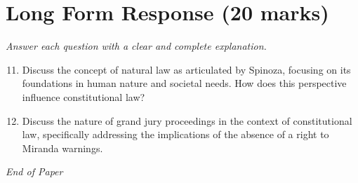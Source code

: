 \documentclass[12pt]{article}
\begin{document}
\section*{Long Form Response (20 marks)}
\textit{Answer each question with a clear and complete explanation.}
\begin{enumerate}[label=\arabic*.]
\setcounter{enumi}{10}
\item Discuss the concept of natural law as articulated by Spinoza, focusing on its foundations in human nature and societal needs. How does this perspective influence constitutional law?
\item Discuss the nature of grand jury proceedings in the context of constitutional law, specifically addressing the implications of the absence of a right to Miranda warnings.
\end{enumerate}

\vfill
\noindent\textit{End of Paper}
\end{document}
